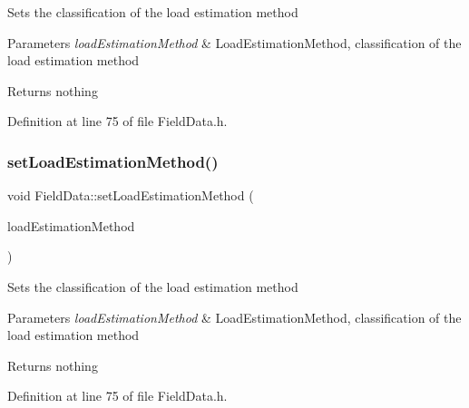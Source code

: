 Sets the classification of the load estimation method


\begin{DoxyParams}{Parameters}
{\em load\+Estimation\+Method} & Load\+Estimation\+Method, classification of the load estimation method\\
\hline
\end{DoxyParams}
\begin{DoxyReturn}{Returns}
nothing 
\end{DoxyReturn}


Definition at line 75 of file Field\+Data.\+h.

\mbox{\label{class_field_data_a7d1103b1832956d96146cbe26fb34a6d}} 
\subsubsection{\texorpdfstring{set\+Load\+Estimation\+Method()}{setLoadEstimationMethod()}\hspace{0.1cm}{\footnotesize\ttfamily [2/3]}}
{\footnotesize\ttfamily void Field\+Data\+::set\+Load\+Estimation\+Method (\begin{DoxyParamCaption}\item[{\hyperlink{class_field_data_a424e89914ba5684c01bb269dbe3312fd}{Load\+Estimation\+Method}}]{load\+Estimation\+Method }\end{DoxyParamCaption})\hspace{0.3cm}{\ttfamily [inline]}}

Sets the classification of the load estimation method


\begin{DoxyParams}{Parameters}
{\em load\+Estimation\+Method} & Load\+Estimation\+Method, classification of the load estimation method\\
\hline
\end{DoxyParams}
\begin{DoxyReturn}{Returns}
nothing 
\end{DoxyReturn}


Definition at line 75 of file Field\+Data.\+h.

\mbox{\label{class_field_data_a7d1103b1832956d96146cbe26fb34a6d}} 
